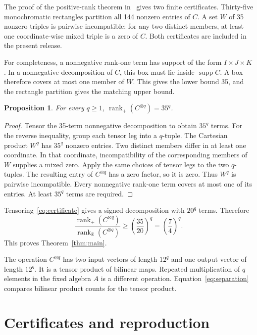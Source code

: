 \documentclass[11pt,a4paper]{article}
\newtheorem{proposition}[theorem]{Proposition}
\DeclareMathOperator{\supp}{supp}
\newcommand{\R}{\mathbb R}\newcommand{\Q}{\mathbb Q}
\newcommand{\rkplus}{\operatorname{rank}_{+}}
\newcommand{\rkreal}{\operatorname{rank}_{\R}}
\begin{document}
The proof of the positive-rank theorem in~\cite{positive} gives two
finite certificates. Thirty-five monochromatic rectangles partition
all 144 nonzero entries of $C$. A set $W$ of 35 nonzero triples is
pairwise incompatible: for any two distinct members, at least one
coordinate-wise mixed triple is a zero of $C$. Both certificates are
included in the present release.

For completeness, a nonnegative rank-one term has support of the form
$I\times J\times K$. In a nonnegative decomposition of $C$, this box
must lie inside $\supp C$. A box therefore covers at most one member
of $W$. This gives the lower bound 35, and the rectangle partition
gives the matching upper bound.

\begin{proposition}\label{prop:powers}
For every $q\geq1$, $\rkplus(C^{\otimes q})=35^q$.
\end{proposition}
\begin{proof}
Tensor the 35-term nonnegative decomposition to obtain $35^q$ terms.
For the reverse inequality, group each tensor leg into a $q$-tuple.
The Cartesian product $W^q$ has $35^q$ nonzero entries. Two distinct
members differ in at least one coordinate. In that coordinate,
incompatibility of the corresponding members of $W$ supplies a mixed
zero. Apply the same choices of tensor legs to the two $q$-tuples.
The resulting entry of $C^{\otimes q}$ has a zero factor, so it is zero.
Thus $W^q$ is pairwise incompatible. Every nonnegative rank-one term
covers at most one of its entries. At least $35^q$ terms are required.
\end{proof}

Tensoring~\eqref{eq:certificate} gives a signed decomposition with
$20^q$ terms. Therefore
\begin{equation}\label{eq:separation}
 \frac{\rkplus(C^{\otimes q})}{\rkreal(C^{\otimes q})}
 \geq\left(\frac{35}{20}\right)^q
 =\left(\frac74\right)^q.
\end{equation}
This proves Theorem~\ref{thm:main}.

The operation $C^{\otimes q}$ has two input vectors of length $12^q$
and one output vector of length $12^q$. It is a tensor product of
bilinear maps. Repeated multiplication of $q$ elements in the fixed
algebra $A$ is a different operation. Equation~\eqref{eq:separation}
compares bilinear product counts for the tensor product.

\section{Certificates and reproduction}
\end{document}

